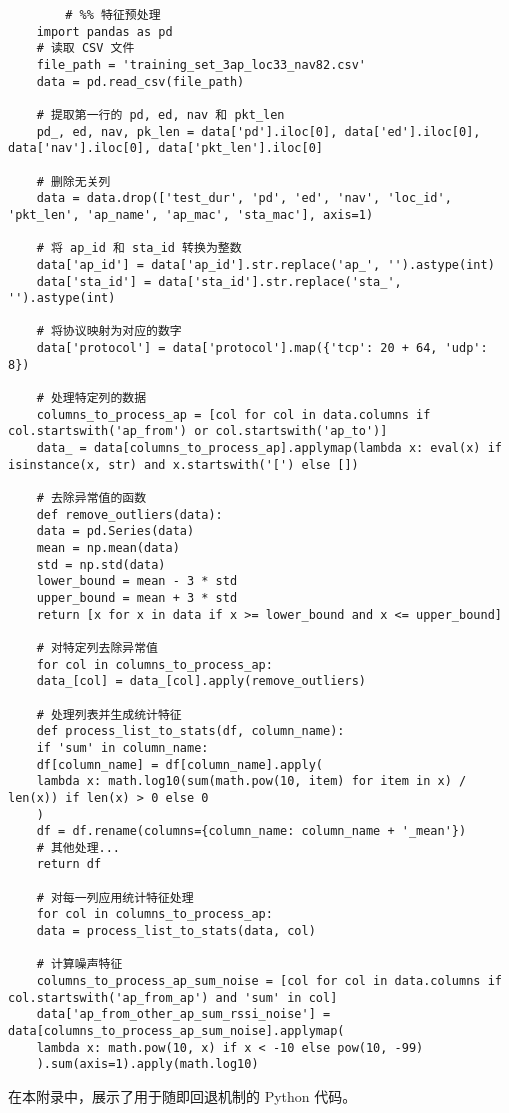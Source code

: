 \documentclass[bwprint,fontset=windows]{gmcmthesis}
\begin{document}
\begin{lstlisting}
		# %% 特征预处理
	import pandas as pd
	# 读取 CSV 文件
	file_path = 'training_set_3ap_loc33_nav82.csv'
	data = pd.read_csv(file_path)
	
	# 提取第一行的 pd, ed, nav 和 pkt_len
	pd_, ed, nav, pk_len = data['pd'].iloc[0], data['ed'].iloc[0], data['nav'].iloc[0], data['pkt_len'].iloc[0]
	
	# 删除无关列
	data = data.drop(['test_dur', 'pd', 'ed', 'nav', 'loc_id', 'pkt_len', 'ap_name', 'ap_mac', 'sta_mac'], axis=1)
	
	# 将 ap_id 和 sta_id 转换为整数
	data['ap_id'] = data['ap_id'].str.replace('ap_', '').astype(int)
	data['sta_id'] = data['sta_id'].str.replace('sta_', '').astype(int)
	
	# 将协议映射为对应的数字
	data['protocol'] = data['protocol'].map({'tcp': 20 + 64, 'udp': 8})
	
	# 处理特定列的数据
	columns_to_process_ap = [col for col in data.columns if col.startswith('ap_from') or col.startswith('ap_to')]
	data_ = data[columns_to_process_ap].applymap(lambda x: eval(x) if isinstance(x, str) and x.startswith('[') else [])
	
	# 去除异常值的函数
	def remove_outliers(data):
	data = pd.Series(data)
	mean = np.mean(data)
	std = np.std(data)
	lower_bound = mean - 3 * std
	upper_bound = mean + 3 * std
	return [x for x in data if x >= lower_bound and x <= upper_bound]
	
	# 对特定列去除异常值
	for col in columns_to_process_ap:
	data_[col] = data_[col].apply(remove_outliers)
	
	# 处理列表并生成统计特征
	def process_list_to_stats(df, column_name):
	if 'sum' in column_name:
	df[column_name] = df[column_name].apply(
	lambda x: math.log10(sum(math.pow(10, item) for item in x) / len(x)) if len(x) > 0 else 0
	)
	df = df.rename(columns={column_name: column_name + '_mean'})
	# 其他处理...
	return df
	
	# 对每一列应用统计特征处理
	for col in columns_to_process_ap:
	data = process_list_to_stats(data, col)
	
	# 计算噪声特征
	columns_to_process_ap_sum_noise = [col for col in data.columns if col.startswith('ap_from_ap') and 'sum' in col]
	data['ap_from_other_ap_sum_rssi_noise'] = data[columns_to_process_ap_sum_noise].applymap(
	lambda x: math.pow(10, x) if x < -10 else pow(10, -99)
	).sum(axis=1).apply(math.log10)
\end{lstlisting}


\noindent 在本附录中，展示了用于随即回退机制的 Python 代码。
\end{document}
